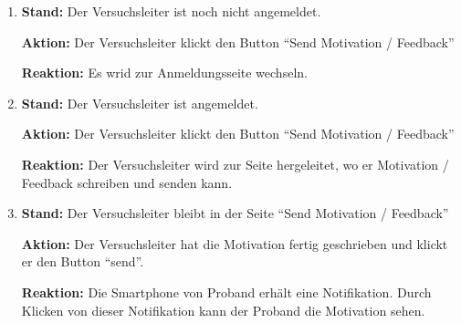 \documentclass[a4paper]{scrreprt}
\begin{document}
\begin{itemize}
                    \begin{enumerate}
                        \item \par \textbf{Stand: } Der \gls{Versuchsleiter} ist noch nicht angemeldet.
                              \par \textbf{Aktion: } Der \gls{Versuchsleiter} klickt den Button ``Send Motivation / Feedback''
                              \par \textbf{Reaktion: } Es wrid zur Anmeldungsseite wechseln.
                        \item \par \textbf{Stand: } Der \gls{Versuchsleiter} ist angemeldet.
                              \par \textbf{Aktion: }  Der \gls{Versuchsleiter} klickt den Button ``Send Motivation / Feedback''
                              \par \textbf{Reaktion: } Der \gls{Versuchsleiter} wird zur Seite hergeleitet, wo er Motivation / Feedback schreiben und senden kann.
                        \item \par \textbf{Stand: } Der \gls{Versuchsleiter} bleibt in der Seite ``Send Motivation / Feedback''
                              \par \textbf{Aktion: } Der \gls{Versuchsleiter} hat die Motivation fertig geschrieben und klickt er den Button ``send''.
                              \par \textbf{Reaktion: } Die Smartphone von \gls{Proband} erh\"alt eine Notifikation. Durch Klicken von dieser Notifikation kann der \gls{Proband} die Motivation sehen.
                    \end{enumerate}




\end{itemize}
\end{document}
